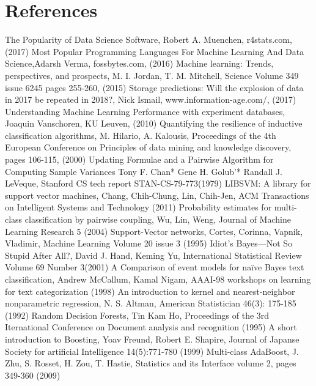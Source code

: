 \documentclass[a4paper,10pt]{article}
\begin{document}
\section{References}
\begingroup
\begin{thebibliography}{9}
 The Popularity of Data Science Software, Robert A. Muenchen, r4stats.com, (2017)
 Most Popular Programming Languages For Machine Learning And Data Science,Adarsh Verma, fossbytes.com, (2016)
Machine learning: Trends, perspectives, and prospects, M. I. Jordan, T. M. Mitchell, Science Volume 349 issue 6245 pages 255-260, (2015)
 Storage predictions: Will the explosion of data in 2017 be repeated in 2018?, Nick Ismail, www.information-age.com/, (2017)
 Understanding Machine Learning Performance with experiment databases, Joaquin Vanschoren, KU Leuven, (2010)
 Quantifying the resilience of inductive classification algorithms, M. Hilario, A. Kalousis, 
Proceedings of the 4th European Conference on Principles of data mining and knowledge discovery, pages 106-115, (2000)
Updating Formulae and a Pairwise Algorithm for Computing Sample Variances Tony F. Chan* Gene H. Golub’* Randall J. LeVeque, Stanford CS tech report STAN-CS-79-773(1979)
LIBSVM: A library for support vector machines, Chang, Chih-Chung, Lin, Chih-Jen, ACM Transactions on Intelligent Systems and Technology (2011)
 Probability estimates for multi-class classification by pairwise coupling, Wu, Lin, Weng, Journal of Machine Learning Research 5 (2004)
 Support-Vector networks, Cortes, Corinna, Vapnik, Vladimir, Machine Learning Volume 20 issue 3 (1995)
 Idiot’s Bayes—Not So Stupid After All?, David J. Hand, Keming Yu, International Statistical Review Volume 69 Number 3(2001)
 A Comparison of event models for naïve Bayes text classification, Andrew McCallum, Kamal Nigam, AAAI-98 workshops on learning for text categorization (1998)
 An introduction to kernel and nearest-neighbor nonparametric regression, N. S. Altman, American Statistician 46(3): 175-185 (1992)
 Random Decision Forests, Tin Kam Ho, Proceedings of the 3rd Iternational Conference on Document analysis and recognition (1995)
 A short introduction to Boosting, Yoav Freund, Robert E. Shapire, Journal of Japanse Society for artificial Intelligence 14(5):771-780 (1999)
 Multi-class AdaBoost, J. Zhu, S. Rosset, H. Zou, T. Hastie, Statistics and its Interface volume 2, pages 349-360 (2009)

\end{thebibliography}
\end{document}

